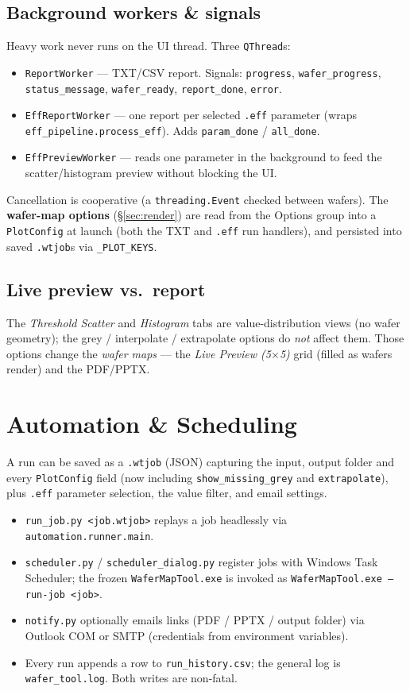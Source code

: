 \documentclass[11pt,a4paper]{article}
\newcommand{\code}[1]{\texttt{#1}}
\begin{document}
\subsection{Background workers \& signals}
Heavy work never runs on the UI thread. Three \code{QThread}s:
\begin{itemize}[nosep,leftmargin=1.4em]
\item \code{ReportWorker} --- TXT/CSV report. Signals: \code{progress},
\code{wafer_progress}, \code{status_message}, \code{wafer_ready},
\code{report_done}, \code{error}.
\item \code{EffReportWorker} --- one report per selected \texttt{.eff} parameter
(wraps \code{eff_pipeline.process_eff}). Adds \code{param_done} / \code{all_done}.
\item \code{EffPreviewWorker} --- reads one parameter in the background to feed the
scatter/histogram preview without blocking the UI.
\end{itemize}
Cancellation is cooperative (a \code{threading.Event} checked between wafers).
The \textbf{wafer-map options} (\S\ref{sec:render}) are read from the Options
group into a \code{PlotConfig} at launch (both the TXT and \texttt{.eff} run
handlers), and persisted into saved \texttt{.wtjob}s via \code{_PLOT_KEYS}.

\subsection{Live preview vs.\ report}
The \emph{Threshold Scatter} and \emph{Histogram} tabs are value-distribution
views (no wafer geometry); the grey / interpolate / extrapolate options do
\emph{not} affect them. Those options change the \emph{wafer maps} --- the
\emph{Live Preview (5$\times$5)} grid (filled as wafers render) and the PDF/PPTX.

\section{Automation \& Scheduling}
A run can be saved as a \texttt{.wtjob} (JSON) capturing the input, output
folder and every \code{PlotConfig} field (now including \code{show_missing_grey}
and \code{extrapolate}), plus \texttt{.eff} parameter selection, the value
filter, and email settings.
\begin{itemize}[nosep,leftmargin=1.4em]
\item \code{run_job.py <job.wtjob>} replays a job headlessly via
\code{automation.runner.main}.
\item \code{scheduler.py} / \code{scheduler_dialog.py} register jobs with Windows
Task Scheduler; the frozen \texttt{WaferMapTool.exe} is invoked as
\code{WaferMapTool.exe --run-job <job>}.
\item \code{notify.py} optionally emails links (PDF / PPTX / output folder) via
Outlook COM or SMTP (credentials from environment variables).
\item Every run appends a row to \texttt{run\_history.csv}; the general log is
\texttt{wafer\_tool.log}. Both writes are non-fatal.
\end{itemize}
\end{document}
